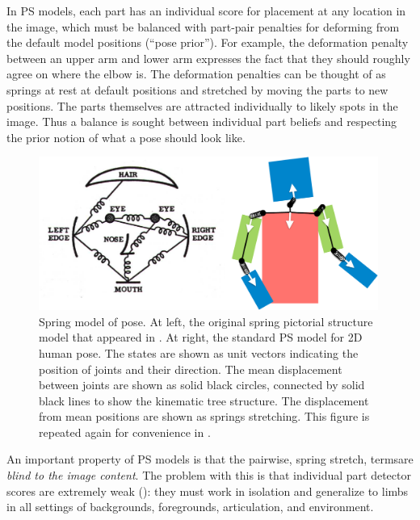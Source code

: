 In PS models, each part has an individual score for placement at any location 
in the image, which must be balanced with part-pair penalties for deforming 
from the default model positions (``pose prior'').  For example, the 
deformation penalty between an upper arm and lower arm expresses the fact that 
they should roughly agree on where the elbow is.  The deformation penalties can 
be thought of as springs at rest at default positions and stretched by moving 
the parts to new positions.  The parts themselves are attracted individually to 
likely spots in the image.  Thus a balance is sought between individual part 
beliefs and respecting the prior notion of what a pose should look like.

\begin{figure}[tb]
\begin{center}
\includegraphics[width=0.99\textwidth]{figs/spring-model.pdf}
\caption[Spring model of pose.]{Spring model of pose.  At left, the original 
spring pictorial structure model that appeared in \citet{fischler1973ps}. At 
right, the standard PS model for 2D human pose.  The states are shown as unit 
vectors indicating the position of joints and their direction.  The mean 
displacement between joints are shown as solid black circles, connected by 
solid black lines to show the kinematic tree structure.  The displacement from 
mean positions are shown as springs stretching.  This figure is repeated again 
for convenience in .}
\label{fig:spring-model-intro}
\end{center}
\end{figure}


An important property of PS models is that the pairwise, spring stretch, 
termsare {\em blind to the image content}.  The problem with this is that 
individual part detector scores are extremely weak (): they 
must work in isolation and generalize to limbs in all settings of backgrounds, 
foregrounds, articulation, and environment.

